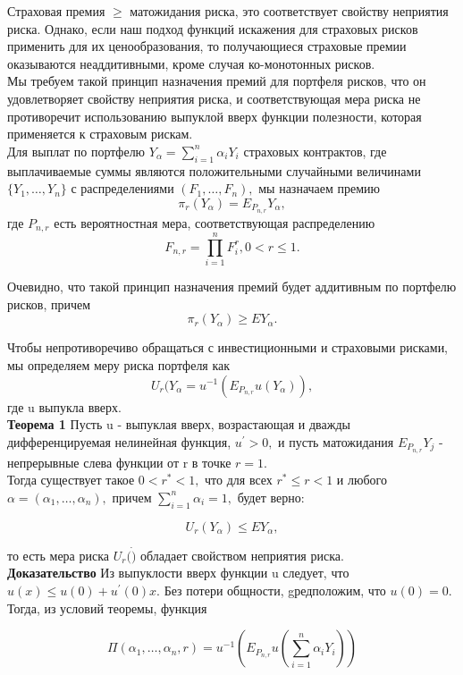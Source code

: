 \documentclass[12pt,a4paper]{article}
\begin{document}
Страховая премия $\geq$ матожидания риска, это соответствует свойству неприятия риска. Однако, если наш подход  функций искажения  для страховых рисков применить для их ценообразования, то получающиеся страховые премии оказываются неаддитивными, кроме случая ко-монотонных рисков.\\

Мы требуем такой принцип назначения премий для портфеля рисков, что он удовлетворяет свойству неприятия риска, и соответствующая мера риска не противоречит использованию выпуклой вверх функции полезности, которая применяется к страховым рискам.\\

Для выплат по портфелю $Y_\alpha = \sum\limits_{i=1}^{n} \alpha_i Y_i $ страховых контрактов, где выплачиваемые суммы являются положительными случайными величинами $\{ Y_1, \dots, Y_n \}$ с распределениями $(F_1, \dots, F_n),$ мы назначаем премию 
$$\pi_{r}(Y_\alpha) = E_{P_{n, r}}Y_{\alpha},$$ 
где $P_{n,r} $ есть вероятностная мера, соответствующая распределению
$$ F_{n,r} = \prod_{i=1}^{n} F_{i}^{r}, 0 < r \leq 1.$$

Очевидно, что такой принцип назначения премий будет аддитивным по портфелю рисков, причем
$$\pi_{r}(Y_{\alpha}) \geq EY_{\alpha}.$$

Чтобы непротиворечиво обращаться с инвестиционными и страховыми рисками, мы определяем меру риска портфеля как 
$$ U_{r}(Y_{\alpha} = u^{-1}(E_{P_{n, r}}u(Y_{\alpha})),$$
где u выпукла вверх.\\

{\bf  Теорема 1} Пусть u - выпуклая вверх, возрастающая и дважды дифференцируемая нелинейная функция, $u^{'} > 0,$  и пусть матожидания $E_{P_{n,r}}Y_{j}$ - непрерывные слева функции от r в точке $r=1.$\\
Тогда существует такое $0 < r^{*} < 1,$ что для всех $r^{*} \leq r < 1$ и любого $\alpha = (\alpha_1, \dots, \alpha_n),$  причем $\sum\limits_{i=1}^{n} \alpha_i = 1,$ будет верно:

$$U_{r}(Y_{\alpha} ) \leq EY_{\alpha},$$

то есть мера риска $U_{r}( \dot ) $ обладает свойством неприятия риска.\\

{\bf  Доказательство} Из выпуклости вверх  функции u следует, что $u(x) \leq u(0) + u^{'}(0)x.$ Без потери общности, gредположим, что $u(0) = 0.$ Тогда, из условий теоремы, функция 

$$ \Pi(\alpha_1, \dots, \alpha_n, r) = u^{-1} (  E_{P_{n,r}} u (\sum\limits_{i=1}^{n} \alpha_i Y_i))$$
\end{document}
